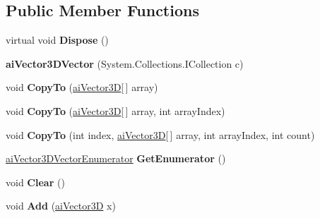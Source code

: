 \subsection*{Public Member Functions}
\begin{DoxyCompactItemize}
\item 
\hypertarget{classai_vector3_d_vector_ab5abad33ca4072439cedf23ba3a35ced}{virtual void {\bfseries Dispose} ()}\label{classai_vector3_d_vector_ab5abad33ca4072439cedf23ba3a35ced}

\item 
\hypertarget{classai_vector3_d_vector_aeca11eec397699eba0c306146149ef67}{{\bfseries ai\+Vector3\+D\+Vector} (System.\+Collections.\+I\+Collection c)}\label{classai_vector3_d_vector_aeca11eec397699eba0c306146149ef67}

\item 
\hypertarget{classai_vector3_d_vector_ab5d834d76d62f8ec99514c9d239da57e}{void {\bfseries Copy\+To} (\hyperlink{structai_vector3_d}{ai\+Vector3\+D}\mbox{[}$\,$\mbox{]} array)}\label{classai_vector3_d_vector_ab5d834d76d62f8ec99514c9d239da57e}

\item 
\hypertarget{classai_vector3_d_vector_a1964132a65a66dda5e16d333aa4a4e4e}{void {\bfseries Copy\+To} (\hyperlink{structai_vector3_d}{ai\+Vector3\+D}\mbox{[}$\,$\mbox{]} array, int array\+Index)}\label{classai_vector3_d_vector_a1964132a65a66dda5e16d333aa4a4e4e}

\item 
\hypertarget{classai_vector3_d_vector_a7f4180ab110ef294caab01b7f6cd3e34}{void {\bfseries Copy\+To} (int index, \hyperlink{structai_vector3_d}{ai\+Vector3\+D}\mbox{[}$\,$\mbox{]} array, int array\+Index, int count)}\label{classai_vector3_d_vector_a7f4180ab110ef294caab01b7f6cd3e34}

\item 
\hypertarget{classai_vector3_d_vector_aaa5cd6a870565af21c3337087a7d35c4}{\hyperlink{classai_vector3_d_vector_1_1ai_vector3_d_vector_enumerator}{ai\+Vector3\+D\+Vector\+Enumerator} {\bfseries Get\+Enumerator} ()}\label{classai_vector3_d_vector_aaa5cd6a870565af21c3337087a7d35c4}

\item 
\hypertarget{classai_vector3_d_vector_aeb452704e4c429c716eaf68c9423627a}{void {\bfseries Clear} ()}\label{classai_vector3_d_vector_aeb452704e4c429c716eaf68c9423627a}

\item 
\hypertarget{classai_vector3_d_vector_ad550ed644ea4556f2a5f5a0e99972094}{void {\bfseries Add} (\hyperlink{structai_vector3_d}{ai\+Vector3\+D} x)}\label{classai_vector3_d_vector_ad550ed644ea4556f2a5f5a0e99972094}


\end{DoxyCompactItemize}
